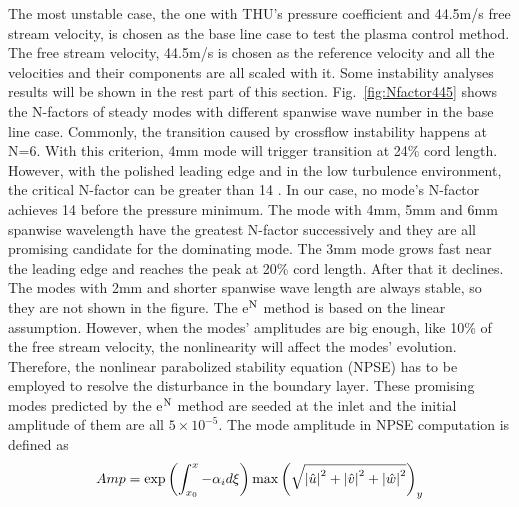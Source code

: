 \documentclass{AIAA}
\begin{document}
The most unstable case, the one with THU's pressure coefficient and 44.5m/s free stream velocity, is chosen as the base line case to test the plasma control method. The free stream velocity, 44.5m/s is chosen as the reference velocity and all the velocities and their components are all scaled with it. Some instability analyses results will be shown in the rest part of this section. Fig.~\ref{fig:Nfactor445} shows the N-factors of steady modes with different spanwise wave number in the base line case. Commonly, the transition caused by crossflow instability happens at N=6. With this criterion, 4mm mode will trigger transition at 24\% cord length. However, with the polished leading edge and in the low turbulence environment, the critical N-factor can be greater than 14 \cite{saric2011}. In our case, no mode's N-factor achieves 14 before the pressure minimum. The mode with 4mm, 5mm and 6mm spanwise wavelength have the greatest N-factor successively and they are all promising candidate for the dominating mode. The 3mm mode grows fast near the leading edge and reaches the peak at 20\% cord length. After that it declines. The modes with 2mm and shorter spanwise wave length are always stable, so they are not shown in the figure. %
The e$^{\rm N}$ method is based on the linear assumption. However, when the modes' amplitudes are big enough, like 10\% of the free stream velocity, the nonlinearity will affect the modes' evolution. Therefore, the nonlinear parabolized stability equation (NPSE) has to be employed to resolve the disturbance in the boundary layer. These promising modes predicted by the e$^{\rm N}$ method are seeded at the inlet and the initial amplitude of them are all $5\times10^{-5}$. The mode amplitude in NPSE computation is defined as
\begin{equation}
Amp={\rm exp}\left(\int_{x_0}^x -\alpha _id\xi\right){\rm max} \left(\sqrt{\left| \hat{u} \right|^2+\left| \hat{v} \right|^2+\left| \hat{w} \right|^2}\right)_y
\end{equation}
\end{document}
